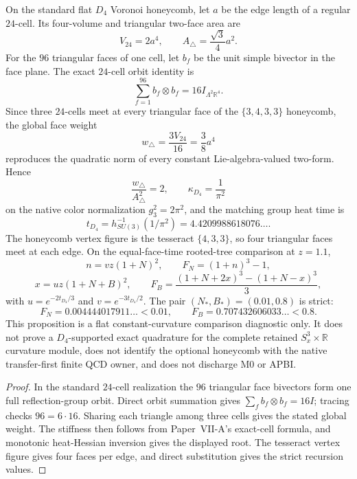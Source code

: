\documentclass[12pt,a4paper]{article}
\begin{document}
\begin{proposition}
\label{p12:prop:v2158-d4-voronoi-constant-curvature}
On the standard flat $D_4$ Voronoi honeycomb, let $a$ be the edge length of a
regular $24$-cell.  Its four-volume and triangular two-face area are
\[
 V_{24}=2a^4,
 \qquad
 A_\triangle=\frac{\sqrt3}{4}a^2.
\]
For the $96$ triangular faces of one cell, let $b_f$ be the unit simple
bivector in the face plane.  The exact $24$-cell orbit identity is
\[
 \boxed{\sum_{f=1}^{96}b_f\otimes b_f=16I_{\Lambda^2\mathbb R^4}.}
\]
Since three $24$-cells meet at every triangular face of the
$\{3,4,3,3\}$ honeycomb, the global face weight
\[
 w_\triangle=\frac{3V_{24}}{16}=\frac38a^4
\]
reproduces the quadratic norm of every constant Lie-algebra-valued two-form.
Hence
\[
 \frac{w_\triangle}{A_\triangle^2}=2,
 \qquad
 \kappa_{D_4}=\frac1{\pi^2}
\]
on the native color normalization $g_3^2=2\pi^2$, and the matching group heat
time is
\[
 \boxed{t_{D_4}=h_{SU(3)}^{-1}(1/\pi^2)
 =4.4209988618076\ldots .}
\]
The honeycomb vertex figure is the tesseract $\{4,3,3\}$, so four triangular
faces meet at each edge.  On the equal-face-time rooted-tree comparison at
$z=1.1$,
\[
 n=vz(1+N)^2,\qquad
 F_N=(1+n)^3-1,
\]
\[
 x=uz(1+N+B)^2,\qquad
 F_B=\frac{(1+N+2x)^3-(1+N-x)^3}{3},
\]
with $u=e^{-2t_{D_4}/3}$ and $v=e^{-3t_{D_4}/2}$.  The pair
$(N_*,B_*)=(0.01,0.8)$ is strict:
\[
 F_N=0.004444017911\ldots<0.01,
 \qquad
 F_B=0.707432606033\ldots<0.8.
\]
This proposition is a flat constant-curvature comparison diagnostic only.  It
does not prove a $D_4$-supported exact quadrature for the complete retained
$S_x^3\times\mathbb R$ curvature module, does not identify the optional
honeycomb with the native transfer-first finite QCD owner, and does not
discharge M0 or APBI.
\end{proposition}
\begin{proof}
In the standard $24$-cell realization the $96$ triangular face bivectors form
one full reflection-group orbit.  Direct orbit summation gives
$\sum_f b_f\otimes b_f=16I$; tracing checks $96=6\cdot16$.  Sharing each
triangle among three cells gives the stated global weight.  The stiffness
then follows from Paper~VII-A's exact-cell formula, and monotonic
heat-Hessian inversion gives the displayed root.  The tesseract vertex figure
gives four faces per edge, and direct substitution gives the strict recursion
values.
\end{proof}
\end{document}
